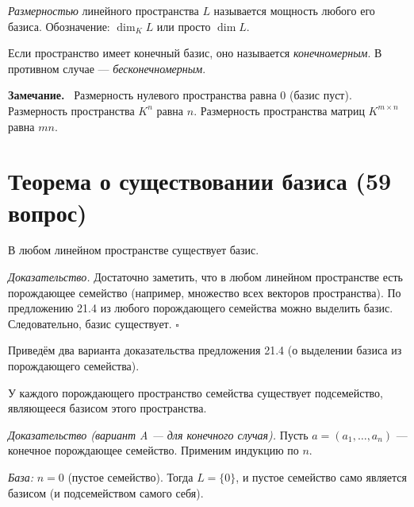 \documentclass[a4paper,12pt]{article}
\newcommand{\myremark}{\textbf{Замечание.}\ }
\theoremstyle{definition}
\theoremstyle{plain}
\theoremstyle{remark}
\begin{document}
	\begin{tcolorbox}[colback=blue!5, colframe=blue!40!black, title=Определение]
		\textit{Размерностью} линейного пространства \( L \) называется мощность любого его базиса. Обозначение: \( \dim_K L \) или просто \( \dim L \).
	\end{tcolorbox}
	
	Если пространство имеет конечный базис, оно называется \textit{конечномерным}. В противном случае — \textit{бесконечномерным}.
	
	\myremark
	Размерность нулевого пространства равна 0 (базис пуст). Размерность пространства \( K^n \) равна \( n \). Размерность пространства матриц \( K^{m \times n} \) равна \( mn \).
	
	
	
	
	
	
	
	\newpage
	\section{Теорема о существовании базиса (59 вопрос)}
	
	\begin{tcolorbox}[colback=red!5, colframe=red!50!black, title=Теорема (Существование базиса)]
		В любом линейном пространстве существует базис.
	\end{tcolorbox}
	
	\medskip
	\textit{Доказательство.}
	Достаточно заметить, что в любом линейном пространстве есть порождающее семейство (например, множество всех векторов пространства). По предложению 21.4 из любого порождающего семейства можно выделить базис. Следовательно, базис существует. \hfill \(\square\)
	
	Приведём два варианта доказательства предложения 21.4 (о выделении базиса из порождающего семейства).
	
	\begin{tcolorbox}[colback=green!5, colframe=green!50!black, title=Предложение 21.4]
		У каждого порождающего пространство семейства существует подсемейство, являющееся базисом этого пространства.
	\end{tcolorbox}
	
	\medskip
	\textit{Доказательство (вариант A — для конечного случая).}
	Пусть \( a = (a_1, \dots, a_n) \) — конечное порождающее семейство. Применим индукцию по \( n \).
	
	\textit{База:} \( n = 0 \) (пустое семейство). Тогда \( L = \{0\} \), и пустое семейство само является базисом (и подсемейством самого себя).
	
\end{document}
